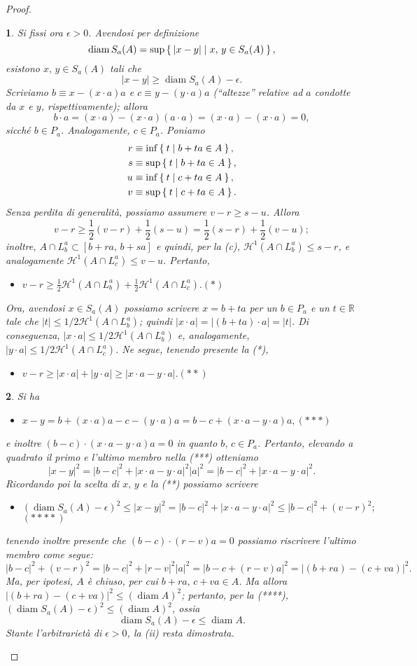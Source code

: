 \documentclass[a4paper,10pt,openright,oneside]{book}
\theoremstyle{theoremstyle}
\theoremstyle{theoremstylewoheader}
\theoremstyle{theoremstyle}
\theoremstyle{proofsecstyle}
\newtheorem{proofsec}{}
\theoremstyle{nonumberplain}
\newtheorem{proof}{Dim.}
\newcommand{\RR}{\ensuremath{\mathbb{R}}}
\newcommand{\Haus}{\ensuremath{\mathcal{H}}}
\newcommand{\abs}[1]{\ensuremath{\lvert #1 \rvert}}
\DeclareMathOperator{\diam}{diam}
\newcommand{\mymath}[2]{\begin{itemize}%
  \item[]\hfill\hbox{}\ensuremath{\displaystyle #1}\hfill\ensuremath{\displaystyle #2}%
  \end{itemize}}
\begin{document}
\begin{proof}
\begin{proofsec}
Si fissi ora $\epsilon > 0$. Avendosi per definizione 
\[
\diam S_a(A) = \sup\Set{ \abs{x - y} | x,\, y \in S_a(A) },
\]
esistono $x,\, y \in S_a(A)$ tali che
\[
\abs{x - y} \ge \diam S_a(A) - \epsilon.
\]
Scriviamo $b \equiv x - (x \cdot a)a$ e $c \equiv y - (y \cdot a)a$ (``altezze'' relative ad $a$ condotte da $x$ e $y$, rispettivamente); allora
\[
b \cdot a = (x \cdot a) - (x \cdot a)(a \cdot a) = (x \cdot a) - (x \cdot a) = 0,
\]
sicché $b \in P_a$. Analogamente, $c \in P_a$. Poniamo 
\begin{align*}
r &\equiv \inf\Set{ t | b + ta \in A },\\
s &\equiv \sup\Set{ t | b + ta \in A },\\
u &\equiv \inf\Set{ t | c + ta \in A },\\
v &\equiv \sup\Set{ t | c + ta \in A }.
\end{align*}
Senza perdita di generalità, possiamo assumere $v - r \ge s - u$. Allora
\[
v - r \ge \frac{1}{2}(v - r) + \frac{1}{2}(s - u) = \frac{1}{2}(s - r) + \frac{1}{2}(v - u);
\]
inoltre, $A \cap L_b^a \subset [b+ra,\, b+sa]$ e quindi, per la (c), $\Haus^1(A \cap L_b^a) \le s - r$, e analogamente $\Haus^1(A \cap L_c^a) \le v - u$. Pertanto, \mymath{v - r \ge \frac{1}{2}\Haus^1(A \cap L_b^a) + \frac{1}{2}\Haus^1(A \cap L_c^a).}{(*)} Ora, avendosi $x \in S_a(A)$ possiamo scrivere $x = b + ta$ per un $b \in P_a$ e un $t \in \RR$ tale che $\abs{t} \le 1/2\Haus^1(A \cap L_b^a)$; quindi $\abs{x \cdot a} = \abs{(b+ta) \cdot a} = \abs{t}$. Di conseguenza, $\abs{x \cdot a} \le 1/2 \Haus^1(A \cap L_b^a)$ e, analogamente, $\abs{y \cdot a} \le 1/2 \Haus^1(A \cap L_c^a)$. Ne segue, tenendo presente la (*), \mymath{v-r \ge \abs{x \cdot a} + \abs{y \cdot a} \ge \abs{x \cdot a - y \cdot a}.}{(**)}
\end{proofsec}

\begin{proofsec}
Si ha \mymath{x-y = b + (x \cdot a)a - c - (y \cdot a)a = b - c + (x \cdot a - y \cdot a)a,}{(***)} e inoltre $(b-c) \cdot (x \cdot a - y \cdot a)a = 0$ in quanto $b,\, c \in P_a$. Pertanto, elevando a quadrato il primo e l'ultimo membro nella (***) otteniamo
\[
\abs{x-y}^2 = \abs{b - c}^2 + \abs{x \cdot a - y \cdot a}^2\abs{a}^2 = \abs{b - c}^2 + \abs{x \cdot a - y \cdot a}^2.
\]
Ricordando poi la scelta di $x,\, y$ e la (**) possiamo scrivere \mymath{(\diam S_a(A) - \epsilon)^2 \le \abs{x - y}^2 = \abs{b - c}^2 + \abs{x \cdot a - y \cdot a}^2 \le \abs{b - c}^2 + (v - r)^2;}{(****)} tenendo inoltre presente che $(b-c) \cdot (r-v)a = 0$ possiamo riscrivere l'ultimo membro come segue:
\[
\abs{b - c}^2 + (v - r)^2 = \abs{b - c}^2 + \abs{r - v}^2\abs{a}^2 = \abs{b - c + (r-v)a}^2 = \abs{(b + ra) - (c + va)}^2.
\]
Ma, per ipotesi, $A$ è chiuso, per cui $b+ra,\, c+va \in A$. Ma allora $\abs{(b + ra) - (c + va)}^2 \le (\diam A)^2$; pertanto, per la (****), $(\diam S_a(A) - \epsilon)^2 \le (\diam A)^2$, ossia
\[
\diam S_a(A) - \epsilon \le \diam A.
\]
Stante l'arbitrarietà di $\epsilon > 0$, la (ii) resta dimostrata.
\end{proofsec}


\end{proof}
\end{document}

